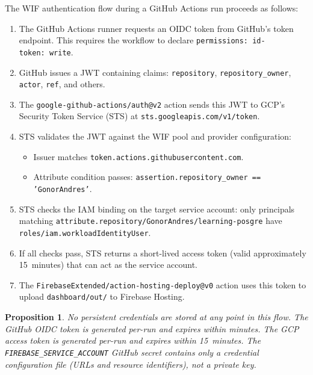 \documentclass[11pt,a4paper]{article}
\theoremstyle{plainref}
\newtheorem{proposition}[definition]{Proposition}
\begin{document}
The WIF authentication flow during a GitHub Actions run proceeds as follows:

\begin{enumerate}[label=\arabic*.]
  \item The GitHub Actions runner requests an OIDC token from GitHub's token
        endpoint. This requires the workflow to declare
        \texttt{permissions:\ id-token:\ write}.
  \item GitHub issues a JWT containing claims: \texttt{repository},
        \texttt{repository\_owner}, \texttt{actor}, \texttt{ref}, and others.
  \item The \texttt{google-github-actions/auth@v2} action sends this JWT to
        GCP's Security Token Service (STS) at \texttt{sts.googleapis.com/v1/token}.
  \item STS validates the JWT against the WIF pool and provider configuration:
        \begin{itemize}
          \item Issuer matches \texttt{token.actions.githubusercontent.com}.
          \item Attribute condition passes:
                \texttt{assertion.repository\_owner == 'GonorAndres'}.
        \end{itemize}
  \item STS checks the IAM binding on the target service account: only
        principals matching
        \texttt{attribute.repository/GonorAndres/learning-posgre}
        have \texttt{roles/iam.workloadIdentityUser}.
  \item If all checks pass, STS returns a short-lived access token (valid
        approximately 15~minutes) that can act as the service account.
  \item The \texttt{FirebaseExtended/action-hosting-deploy@v0} action uses this
        token to upload \texttt{dashboard/out/} to Firebase Hosting.
\end{enumerate}

\begin{proposition}
No persistent credentials are stored at any point in this flow. The GitHub
OIDC token is generated per-run and expires within minutes. The GCP access
token is generated per-run and expires within 15~minutes. The
\texttt{FIREBASE\_SERVICE\_ACCOUNT} GitHub secret contains only a credential
configuration file (URLs and resource identifiers), not a private key.
\end{proposition}

\end{document}
